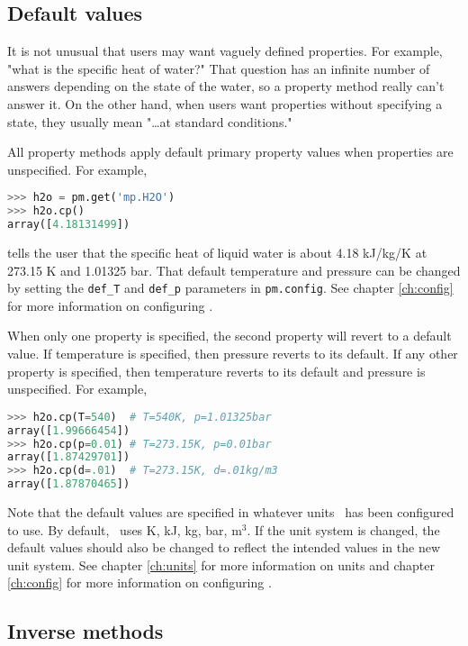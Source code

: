 \subsection{Default values}

It is not unusual that users may want vaguely defined properties.  For example, "what is the specific heat of water?"  That question has an infinite number of answers depending on the state of the water, so a property method really can't answer it.  On the other hand, when users want properties without specifying a state, they usually mean "\ldots at standard conditions."

All property methods apply default primary property values when properties are unspecified.  For example,
\begin{lstlisting}[language=Python]
>>> h2o = pm.get('mp.H2O')
>>> h2o.cp()
array([4.18131499])
\end{lstlisting}
tells the user that the specific heat of liquid water is about 4.18 kJ/kg/K at 273.15 K and 1.01325 bar.  That default temperature and pressure can be changed by setting the \verb|def_T| and \verb|def_p| parameters in \texttt{pm.config}.  See chapter \ref{ch:config} for more information on configuring \PM.

When only one property is specified, the second property will revert to a default value.  If temperature is specified, then pressure reverts to its default.  If any other property is specified, then temperature reverts to its default and pressure is unspecified.  For example,
\begin{lstlisting}[language=Python]
>>> h2o.cp(T=540)  # T=540K, p=1.01325bar
array([1.99666454])
>>> h2o.cp(p=0.01) # T=273.15K, p=0.01bar
array([1.87429701])
>>> h2o.cp(d=.01)  # T=273.15K, d=.01kg/m3
array([1.87870465])
\end{lstlisting}

Note that the default values are specified in whatever units \PM\ has been configured to use.  By default, \PM\ uses K, kJ, kg, bar, m$^3$.  If the unit system is changed, the default values should also be changed to reflect the intended values in the new unit system.  See chapter \ref{ch:units} for more information on units and chapter \ref{ch:config} for more information on configuring \PM.

\subsection{Inverse methods}\label{sec:start:inverse}

